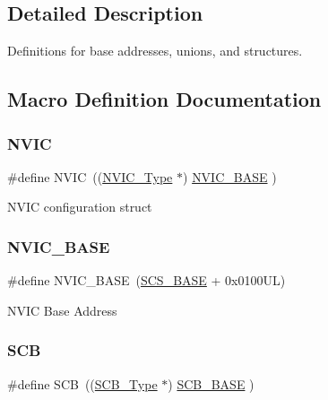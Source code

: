 \subsection{Detailed Description}
Definitions for base addresses, unions, and structures. 



\subsection{Macro Definition Documentation}
\mbox{\label{group___c_m_s_i_s__core__base_gac8e97e8ce56ae9f57da1363a937f8a17}} 
\subsubsection{\texorpdfstring{NVIC}{NVIC}}
{\footnotesize\ttfamily \#define N\+V\+IC~((\mbox{\hyperlink{struct_n_v_i_c___type}{N\+V\+I\+C\+\_\+\+Type}}      $\ast$)     \mbox{\hyperlink{group___c_m_s_i_s__core__base_gaa0288691785a5f868238e0468b39523d}{N\+V\+I\+C\+\_\+\+B\+A\+SE}}     )}

N\+V\+IC configuration struct \mbox{\label{group___c_m_s_i_s__core__base_gaa0288691785a5f868238e0468b39523d}} 
\subsubsection{\texorpdfstring{NVIC\_BASE}{NVIC\_BASE}}
{\footnotesize\ttfamily \#define N\+V\+I\+C\+\_\+\+B\+A\+SE~(\mbox{\hyperlink{group___c_m_s_i_s__core__base_ga3c14ed93192c8d9143322bbf77ebf770}{S\+C\+S\+\_\+\+B\+A\+SE}} +  0x0100\+U\+L)}

N\+V\+IC Base Address \mbox{\label{group___c_m_s_i_s__core__base_gaaaf6477c2bde2f00f99e3c2fd1060b01}} 
\subsubsection{\texorpdfstring{SCB}{SCB}}
{\footnotesize\ttfamily \#define S\+CB~((\mbox{\hyperlink{struct_s_c_b___type}{S\+C\+B\+\_\+\+Type}}       $\ast$)     \mbox{\hyperlink{group___c_m_s_i_s__core__base_gad55a7ddb8d4b2398b0c1cfec76c0d9fd}{S\+C\+B\+\_\+\+B\+A\+SE}}      )}

